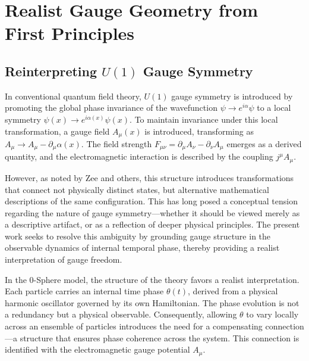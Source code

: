 \documentclass[%
 reprint,
 amsmath,amssymb,
 aps,
]{revtex4-1}
\numberwithin{equation}{section}%
\begin{document}
\section{Realist Gauge Geometry from First Principles}

\subsection{Reinterpreting $U(1)$ Gauge Symmetry}

In conventional quantum field theory, $U(1)$ gauge symmetry is introduced by promoting the global phase invariance of the wavefunction $\psi \to e^{i\alpha} \psi$ to a local symmetry $\psi(x) \to e^{i\alpha(x)} \psi(x)$. To maintain invariance under this local transformation, a gauge field $A_\mu(x)$ is introduced, transforming as $A_\mu \to A_\mu - \partial_\mu \alpha(x)$. The field strength $F_{\mu\nu} = \partial_\mu A_\nu - \partial_\nu A_\mu$ emerges as a derived quantity, and the electromagnetic interaction is described by the coupling $j^\mu A_\mu$.

However, as noted by Zee and others, this structure introduces transformations that connect not physically distinct states, but alternative mathematical descriptions of the same configuration. This has long posed a conceptual tension regarding the nature of gauge symmetry—whether it should be viewed merely as a descriptive artifact, or as a reflection of deeper physical principles. The present work seeks to resolve this ambiguity by grounding gauge structure in the observable dynamics of internal temporal phase, thereby providing a realist interpretation of gauge freedom.

In the 0-Sphere model, the structure of the theory favors a realist interpretation. Each particle carries an internal time phase $\theta(t)$, derived from a physical harmonic oscillator governed by its own Hamiltonian. The phase evolution is not a redundancy but a physical observable. Consequently, allowing $\theta$ to vary locally across an ensemble of particles introduces the need for a compensating connection—a structure that ensures phase coherence across the system. This connection is identified with the electromagnetic gauge potential $A_\mu$.
\end{document}
